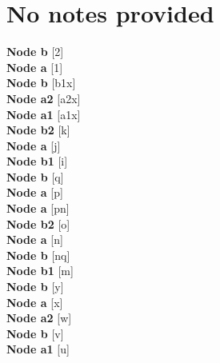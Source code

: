 \documentclass[10pt,a4wide]{article}
\begin{document}
\section*{No notes provided}
\textbf{Node  b} [2]\\\textbf{Node  a} [1]\\\textbf{Node  b} [b1x]\\\textbf{Node  a2} [a2x]\\\textbf{Node  a1} [a1x]\\\textbf{Node  b2} [k]\\\textbf{Node  a} [j]\\\textbf{Node  b1} [i]\\\textbf{Node  b} [q]\\\textbf{Node  a} [p]\\\textbf{Node  a} [pn]\\\textbf{Node  b2} [o]\\\textbf{Node  a} [n]\\\textbf{Node  b} [nq]\\\textbf{Node  b1} [m]\\\textbf{Node  b} [y]\\\textbf{Node  a} [x]\\\textbf{Node  a2} [w]\\\textbf{Node  b} [v]\\\textbf{Node  a1} [u]\\
\end{document}
